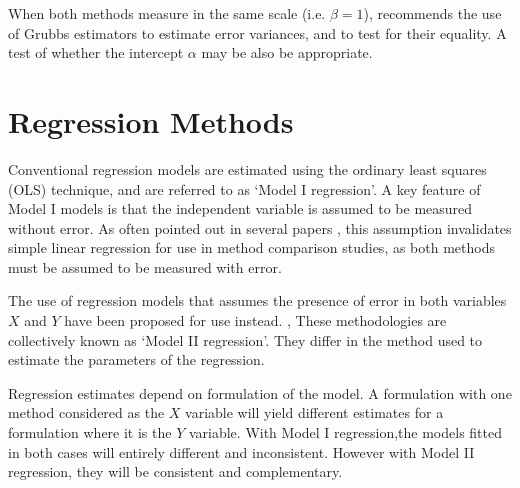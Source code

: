\documentclass[12pt, a4paper]{report}
\begin{document}
When both methods measure in the same scale (i.e. $\beta = 1$),
\citet{DunnSEME} recommends the use of Grubbs estimators to
estimate error variances, and to test for their equality. A test
of whether the intercept $\alpha$ may be also be appropriate.







\newpage
\section{Regression Methods}
Conventional regression models are estimated using the ordinary
least squares (OLS) technique, and are referred to as `Model I
regression'\citep{CornCoch,ludbrook97}. A key feature of Model I
models is that the independent variable is assumed to be measured
without error. As often pointed out in several papers
\citep{BA83,ludbrook97}, this assumption invalidates simple linear
regression for use in method comparison studies, as both methods
must be assumed to be measured with error.

The use of regression models that assumes the presence of error in
both variables $X$ and $Y$ have been proposed for use instead.
\citep{CornCoch,ludbrook97}, These methodologies are collectively
known as `Model II regression'. They differ in the method used to
estimate the parameters of the regression.

Regression estimates depend on formulation of the model. A
formulation with one method considered as the $X$ variable will
yield different estimates for a formulation where it is the $Y$
variable. With Model I regression,the models fitted in both cases
will entirely different and inconsistent. However with Model II
regression, they will be consistent and complementary.
\end{document}
